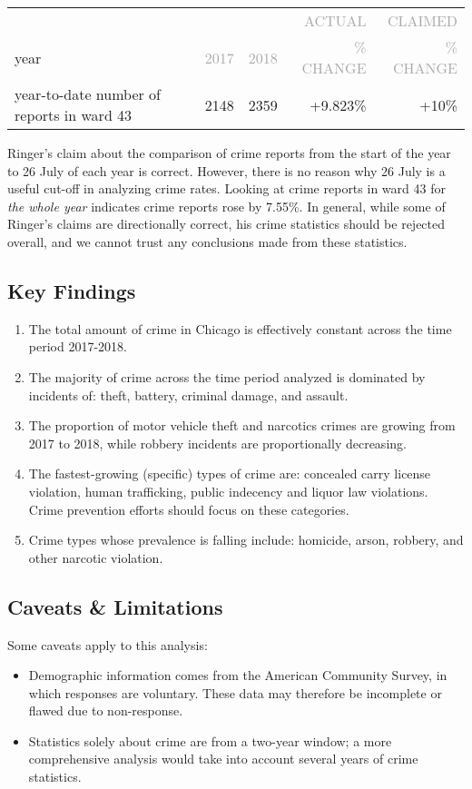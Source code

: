 \documentclass[11pt]{article}
\newcommand{\printsubsection}[1]{\normalfont\headerfontlt\textcolor{darkgray}{{#1}}}
\newcommand{\opns}[1]{\textrm{\small\printsubsection{\MakeUppercase{#1}}}}
\begin{document}
\begin{table}[H]
\centering \renewcommand{\arraystretch}{1.2}
\begin{tabular}{l|rr|rr}
{}   & {}             &                & \opns{ACTUAL} & \opns{CLAIMED} \\
year &    \opns{2017} &    \opns{2018} & \opns{\% change} & \opns{\% change} \\\hline
year-to-date number of reports in ward 43   &  2148 &  2359 & +9.823\% & +10\%\\
\end{tabular}
\end{table}

Ringer's claim about the comparison of crime reports from the start of the year to 26 July of each year is correct. However, there is no reason why 26 July is a useful cut-off in analyzing crime rates. Looking at crime reports in ward 43 for \textit{the whole year} indicates crime reports rose by 7.55\%.
In general, while some of Ringer's claims are directionally correct, his crime statistics should be rejected overall, and we cannot trust any conclusions made from these statistics.
\subsection{Key Findings}
\begin{enumerate}
\item The total amount of crime in Chicago is effectively constant across the time period 2017-2018.
\item The majority of crime across the time period analyzed is dominated by incidents of: theft, battery, criminal damage, and assault. 
\item The proportion of motor vehicle theft and narcotics crimes are growing from 2017 to 2018, while robbery incidents are proportionally decreasing.
\item The fastest-growing (specific) types of crime are: concealed carry license violation, human trafficking, public indecency and liquor law violations. Crime prevention efforts should focus on these categories.
\item Crime types whose prevalence is falling include: homicide, arson, robbery, and other narcotic violation.
\end{enumerate}
\subsection{Caveats \& Limitations}
Some caveats apply to this analysis:
\begin{itemize}
\item Demographic information comes from the American Community Survey, in which responses are voluntary. These data may therefore be incomplete or flawed due to non-response.
\item Statistics solely about crime are from a two-year window; a more comprehensive analysis would take into account several years of crime statistics.
\end{itemize}
\end{document}
